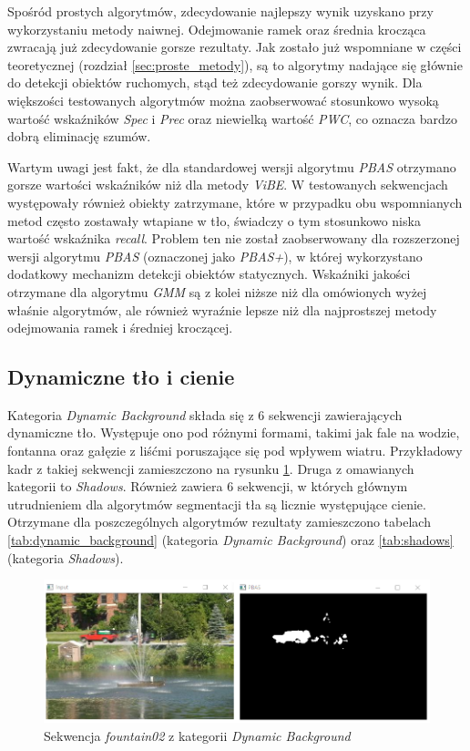 Spośród prostych algorytmów, zdecydowanie najlepszy wynik uzyskano przy wykorzystaniu metody naiwnej. 
Odejmowanie ramek oraz średnia krocząca zwracają już zdecydowanie gorsze rezultaty. 
Jak zostało już wspomniane w części teoretycznej (rozdział \ref{sec:proste_metody}), są to algorytmy nadające się głównie do detekcji obiektów ruchomych, stąd też zdecydowanie gorszy wynik. %
Dla większości testowanych algorytmów można zaobserwować stosunkowo wysoką wartość wskaźników \textit{Spec} i \textit{Prec} oraz niewielką wartość \textit{PWC}, co oznacza bardzo dobrą eliminację szumów. 

Wartym uwagi jest fakt, że dla standardowej wersji algorytmu \textit{PBAS} otrzymano gorsze wartości wskaźników niż dla metody \textit{ViBE}. 
W testowanych sekwencjach występowały również obiekty zatrzymane, które w przypadku obu wspomnianych metod często zostawały wtapiane w tło, świadczy o tym stosunkowo niska wartość wskaźnika \textit{recall}. 
Problem ten nie został zaobserwowany dla rozszerzonej wersji algorytmu \textit{PBAS} (oznaczonej jako \textit{PBAS+}), w której wykorzystano dodatkowy mechanizm detekcji obiektów statycznych. 
Wskaźniki jakości otrzymane dla algorytmu \textit{GMM} są z kolei niższe niż dla omówionych wyżej właśnie algorytmów, ale również wyraźnie lepsze niż dla najprostszej metody odejmowania ramek i średniej kroczącej. 


\subsection{Dynamiczne tło i cienie}
\label{subsec:dynamiczne_tlo_cienie}

Kategoria \textit{Dynamic Background} składa się z 6 sekwencji zawierających dynamiczne tło. 
Występuje ono pod różnymi formami, takimi jak fale na wodzie, fontanna oraz gałęzie z liśćmi poruszające się pod wpływem wiatru. 
Przykładowy kadr z takiej sekwencji zamieszczono na rysunku \ref{fig:dynamic_example}. 
Druga z omawianych kategorii to \textit{Shadows}. 
Również zawiera 6 sekwencji, w których głównym utrudnieniem dla algorytmów segmentacji tła są licznie występujące cienie. 
Otrzymane dla poszczególnych algorytmów rezultaty zamieszczono tabelach \ref{tab:dynamic_background} (kategoria \textit{Dynamic Background}) oraz \ref{tab:shadows} (kategoria \textit{Shadows}).

    \begin{figure}[h]
			\centering
			\includegraphics[scale=0.65]{img/5/dynamic_example.png}
			\caption{Sekwencja \textit{fountain02} z kategorii \textit{Dynamic Background}}
			\label{fig:dynamic_example}
	\end{figure}

